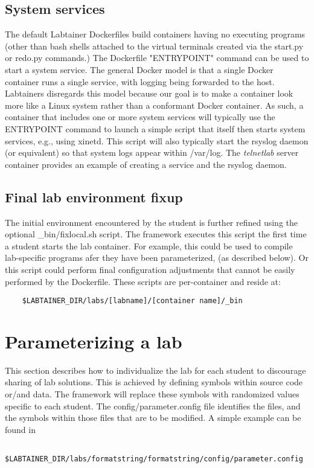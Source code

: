\documentclass{article}
\begin{document}
\subsection {System services}
The default Labtainer Dockerfiles build containers having no executing programs (other than
bash shells attached to the virtual terminals created via the start.py or redo.py commands.)  
The Dockerfile "ENTRYPOINT" command can be used to start a system service.  The general Docker 
model is that a single Docker container runs a single service, with logging being forwarded to 
the host.  Labtainers disregards this model because our goal is to make a container look more like a Linux
system rather than a conformant Docker container. As such, a container that includes one or more
system services will typically use the ENTRYPOINT command to launch a simple script that itself then
starts system services, e.g., using xinetd.  This script will also typically start the rsyslog
daemon (or equivalent) so that system logs appear within /var/log.  The \textit{telnetlab} server container
provides an example of creating a service and the rsyslog daemon.


\subsection{Final lab environment fixup}
The initial environment encountered by the student is further refined using
the optional \_bin/fixlocal.sh script.  The framework executes
this script the first time a student starts the lab container.  For example,
this could be used to compile lab-specific programs afer they have been parameterized,
(as described below).  Or this script could perform final configuration adjustments
that cannot be easily performed by the Dockerfile.  These scripts are per-container
and reside at:
\begin{verbatim}
    $LABTAINER_DIR/labs/[labname]/[container name]/_bin
\end{verbatim}

\section{Parameterizing a lab}
This section describes how to individualize the lab for each student to discourage
sharing of lab solutions.  This is achieved by defining symbols within source 
code or/and data.  The framework will replace these symbols with randomized values
specific to each student.  The config/parameter.config file identifies the files, and
the symbols within those files that are to be modified.  A simple example can be found in 
\begin{verbatim}
    $LABTAINER_DIR/labs/formatstring/formatstring/config/parameter.config
\end{verbatim}
\end{document}
